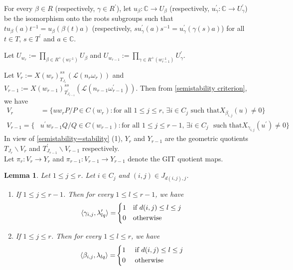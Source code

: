 \documentclass[12pt,reqno]{amsart}
\numberwithin{equation}{section}
\newtheorem{lemma}[theorem]{Lemma}
\theoremstyle{definition}
\begin{document}
For every $\beta\in R$ (respectively, $\gamma\in R^{\prime}$), let $u_{\beta}:\mathbb{C}\rightarrow U_{\beta}$ (respectively, $u^{\prime}_{\gamma}:\mathbb{C}\rightarrow U^{\prime}_{\gamma}$) be the isomorphism onto the roots subgroups such that $tu_{\beta}(a)t^{-1}=u_{\beta}(\beta(t)a)$ (respectively, $su^{\prime}_{\gamma}(a)s^{-1}=u^{\prime}_{\gamma}(\gamma(s)a)$)
 for all $t\in T$, $s\in T^{\prime}$ and $a\in\mathbb{C}$.

Let $U_{w_{r}}:=\prod_{\beta\in R^{+}(w_{r}^{-1})}U_{\beta}$ and $U_{w_{r-1}}:=\prod_{\gamma\in R^{+}(w_{r-1}^{-1})}U^{\prime}_{\gamma}$.

Let $V_{r}:=X(w_{r})^{ss}_{T_{J_{r}}}(\mathcal{L}(n_{r}\omega_{r}))$ and $V_{r-1}:=X(w_{r-1})^{ss}_{T^{\prime}_{J_{r-1}}}(\mathcal{L}(n_{r-1}\omega_{r-1}^{\prime}))$. 
Then from \cref{semistability criterion}, we have %
\begin{align}
	V_{r}&=\{uw_{r}P/P\in C(w_{r}): \text{for all $1\leq j\leq r$, $\exists i\in C_{j}$ such that} X_{\beta_{i,j}}(u)\neq 0 \}\label{eq 5.1.5}\\
	V_{r-1}=\{&u^{\prime}w_{r-1}Q/Q\in C(w_{r-1}): \text{for all $1\leq j\leq r-1$,  $\exists i\in C_{j}$ }
		\text{such that} X_{\gamma_{i,j}}(u^{\prime})\neq 0 \}\label{eq 5.1.6}
\end{align} 
In view of \cref{semistability=stability} (1), $Y_{r}$ and $Y_{r-1}$ are the geometric quotients $T_{J_{r}}\backslash V_{r}$ and $T^{\prime}_{J_{r-1}}\backslash V_{r-1}$ respectively.\\
Let $\pi_{r}:V_{r}\longrightarrow Y_{r}$ and $\pi_{r-1}:V_{r-1}\longrightarrow Y_{r-1}$ denote the GIT quotient maps.
\begin{lemma}\label{section:quotient:lemma 1}
	Let $1\leq j\leq r$. Let $i\in C_{j}$ and $(i,j)\in J_{d(i,j),j}$. \begin{enumerate}
		\item	If $1\leq j\leq r-1$. Then for every $1\leq l\leq r-1$, we have 
		\begin{align*}
			\langle \gamma_{i,j},\lambda^{\prime}_{lq}\rangle=&\begin{dcases}
				1&\text{if $d(i,j)\leq l\leq j$}\\
				0&\text{otherwise}
			\end{dcases}
		\end{align*}
		\item If $1\leq j\leq r$. Then for every $1\leq l\leq r$, we have 
		\begin{align*}
			\langle\beta_{i,j},\lambda_{lq}\rangle=&\begin{dcases}
				1&\text{ if $d(i,j)\leq l\leq j$}\\
				0&\text{ otherwise}
			\end{dcases}
		\end{align*}
	\end{enumerate}
\end{lemma}
\end{document}
